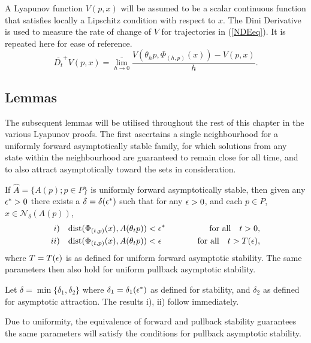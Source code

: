 A Lyapunov function $V(p, x)$ will be assumed to be a scalar continuous
function that satisfies locally a Lipschitz condition with respect to $x$.
The Dini Derivative is used to measure the rate of change of $V$ for trajectories 
in (\ref{NDEeq}). It is repeated here for ease of reference.
\begin{equation}
\label{Dinieq}
  \overline{D_t}^+ V(p, x) = \overline{\lim_{h \to 0}} \frac{V(\theta_{h}p,
\Phi_{(h, p)}(x)) - V(p, x)}{h}.
\end{equation}

\subsection{Lemmas}
The subsequent lemmas will be utilised throughout the rest of this
chapter in the various Lyapunov proofs. The first ascertains a
single neighbourhood for a uniformly forward asymptotically stable
family, for which solutions from any state within the
neighbourhood are guaranteed to remain close for all time, and to
also attract asymptotically toward the sets in consideration.

\begin{lemma}
\label{intro1lem}
If $\hat{A} = \{A(p); p \in P\}$ is uniformly forward asymptotically stable,
then given any $\epsilon^* > 0$ there exists a $\delta = \delta(\epsilon^*)$ such that for
any $\epsilon > 0$, and each $p \in P$, $x \in \mathcal{N}_{\delta} (A(p))$,
\begin{align*}
  i) \quad & {\rm dist}( \Phi_{(t, p)}(x), A(\theta_{t}p)) < \epsilon^* \hspace{1cm} &
  \text{for all} \quad t > 0, \\
  ii) \quad & {\rm dist}( \Phi_{(t, p)}(x), A(\theta_{t}p)) < \epsilon \hspace{1cm} &
  \text{for all} \quad t > T(\epsilon),
\end{align*}
where $T=T(\epsilon)$ is as defined for uniform forward asymptotic stability.
The same parameters then also hold for uniform pullback asymptotic stability.
\end{lemma}
\begin{prf}
  Let $\delta = \min \{ \delta_1, \delta_2  \}$ where $\delta_1 =
  \delta_1(\epsilon^*)$ as defined for stability, and $\delta_2$ as defined for
  asymptotic attraction. The results i), ii) follow immediately.

  Due to uniformity, the equivalence of forward and pullback stability
  guarantees the same parameters will satisfy the conditions for pullback
  asymptotic stability.
\end{prf}

